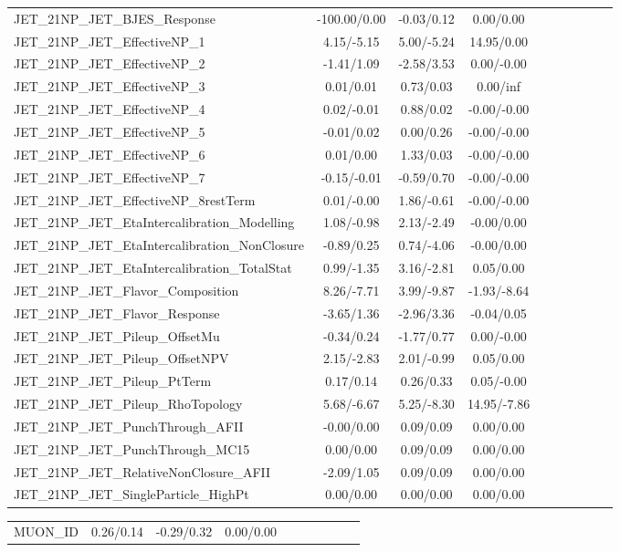 \begin{table}[h]
\begin{center}
\begin{tabular}{l|ccccccccc}
JET\_21NP\_JET\_BJES\_Response &-100.00/0.00 &-0.03/0.12 &0.00/0.00 \\
JET\_21NP\_JET\_EffectiveNP\_1 &4.15/-5.15 &5.00/-5.24 &14.95/0.00 \\
JET\_21NP\_JET\_EffectiveNP\_2 &-1.41/1.09 &-2.58/3.53 &0.00/-0.00 \\
JET\_21NP\_JET\_EffectiveNP\_3 &0.01/0.01 &0.73/0.03 &0.00/inf \\
JET\_21NP\_JET\_EffectiveNP\_4 &0.02/-0.01 &0.88/0.02 &-0.00/-0.00 \\
JET\_21NP\_JET\_EffectiveNP\_5 &-0.01/0.02 &0.00/0.26 &-0.00/-0.00 \\
JET\_21NP\_JET\_EffectiveNP\_6 &0.01/0.00 &1.33/0.03 &-0.00/-0.00 \\
JET\_21NP\_JET\_EffectiveNP\_7 &-0.15/-0.01 &-0.59/0.70 &-0.00/-0.00 \\
JET\_21NP\_JET\_EffectiveNP\_8restTerm &0.01/-0.00 &1.86/-0.61 &-0.00/-0.00 \\
JET\_21NP\_JET\_EtaIntercalibration\_Modelling &1.08/-0.98 &2.13/-2.49 &-0.00/0.00 \\
JET\_21NP\_JET\_EtaIntercalibration\_NonClosure &-0.89/0.25 &0.74/-4.06 &-0.00/0.00 \\
JET\_21NP\_JET\_EtaIntercalibration\_TotalStat &0.99/-1.35 &3.16/-2.81 &0.05/0.00 \\
JET\_21NP\_JET\_Flavor\_Composition &8.26/-7.71 &3.99/-9.87 &-1.93/-8.64 \\
JET\_21NP\_JET\_Flavor\_Response &-3.65/1.36 &-2.96/3.36 &-0.04/0.05 \\
JET\_21NP\_JET\_Pileup\_OffsetMu &-0.34/0.24 &-1.77/0.77 &0.00/-0.00 \\
JET\_21NP\_JET\_Pileup\_OffsetNPV &2.15/-2.83 &2.01/-0.99 &0.05/0.00 \\
JET\_21NP\_JET\_Pileup\_PtTerm &0.17/0.14 &0.26/0.33 &0.05/-0.00 \\
JET\_21NP\_JET\_Pileup\_RhoTopology &5.68/-6.67 &5.25/-8.30 &14.95/-7.86 \\
JET\_21NP\_JET\_PunchThrough\_AFII &-0.00/0.00 &0.09/0.09 &0.00/0.00 \\
JET\_21NP\_JET\_PunchThrough\_MC15 &0.00/0.00 &0.09/0.09 &0.00/0.00 \\
JET\_21NP\_JET\_RelativeNonClosure\_AFII &-2.09/1.05 &0.09/0.09 &0.00/0.00 \\
JET\_21NP\_JET\_SingleParticle\_HighPt &0.00/0.00 &0.00/0.00 &0.00/0.00 \\
\hline \end{tabular} \end{center} \end{table} \begin{table}[h] \scriptsize \begin{center} \begin{tabular}{l|ccccccccc} \hline MUON\_ID &0.26/0.14 &-0.29/0.32 &0.00/0.00 \\

\end{tabular}
\end{center}
\end{table}
